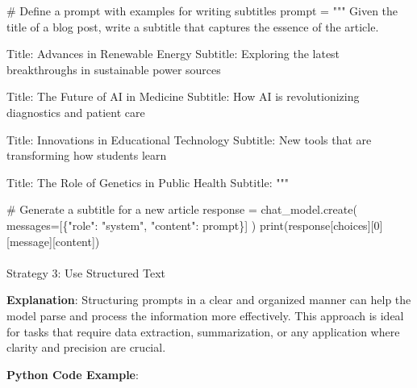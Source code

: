 \documentclass[
]{agujournal2019}
\makeatletter
\let\oldparagraph\paragraph
\renewcommand{\paragraph}{
    \@ifstar
      \xxxParagraphStar
      \xxxParagraphNoStar
  }
\newcommand{\xxxParagraphStar}[1]{\oldparagraph*{#1}\mbox{}}
\newcommand{\xxxParagraphNoStar}[1]{\oldparagraph{#1}\mbox{}}
\newenvironment{Shaded}{\begin{snugshade}}{\end{snugshade}}
\newcommand{\BuiltInTok}[1]{\textcolor[rgb]{0.00,0.23,0.31}{#1}}
\newcommand{\CommentTok}[1]{\textcolor[rgb]{0.37,0.37,0.37}{#1}}
\newcommand{\DecValTok}[1]{\textcolor[rgb]{0.68,0.00,0.00}{#1}}
\newcommand{\NormalTok}[1]{\textcolor[rgb]{0.00,0.23,0.31}{#1}}
\newcommand{\OperatorTok}[1]{\textcolor[rgb]{0.37,0.37,0.37}{#1}}
\newcommand{\StringTok}[1]{\textcolor[rgb]{0.13,0.47,0.30}{#1}}
\makeatother
\begin{document}
\begin{Shaded}
\begin{Highlighting}[]
\CommentTok{\# Define a prompt with examples for writing subtitles}
\NormalTok{prompt }\OperatorTok{=} \StringTok{"""}
\StringTok{Given the title of a blog post, write a subtitle that captures the essence of the article.}

\StringTok{Title: Advances in Renewable Energy}
\StringTok{Subtitle: Exploring the latest breakthroughs in sustainable power sources}

\StringTok{Title: The Future of AI in Medicine}
\StringTok{Subtitle: How AI is revolutionizing diagnostics and patient care}

\StringTok{Title: Innovations in Educational Technology}
\StringTok{Subtitle: New tools that are transforming how students learn}

\StringTok{Title: The Role of Genetics in Public Health}
\StringTok{Subtitle: }
\StringTok{"""}

\CommentTok{\# Generate a subtitle for a new article}
\NormalTok{response }\OperatorTok{=}\NormalTok{ chat\_model.create(}
\NormalTok{    messages}\OperatorTok{=}\NormalTok{[\{}\StringTok{"role"}\NormalTok{: }\StringTok{"system"}\NormalTok{, }\StringTok{"content"}\NormalTok{: prompt\}]}
\NormalTok{)}
\BuiltInTok{print}\NormalTok{(response[}\StringTok{\textquotesingle{}choices\textquotesingle{}}\NormalTok{][}\DecValTok{0}\NormalTok{][}\StringTok{\textquotesingle{}message\textquotesingle{}}\NormalTok{][}\StringTok{\textquotesingle{}content\textquotesingle{}}\NormalTok{])}
\end{Highlighting}
\end{Shaded}

\paragraph{Strategy 3: Use Structured
Text}\label{strategy-3-use-structured-text}

\textbf{Explanation}: Structuring prompts in a clear and organized
manner can help the model parse and process the information more
effectively. This approach is ideal for tasks that require data
extraction, summarization, or any application where clarity and
precision are crucial.

\textbf{Python Code Example}:
\end{document}
